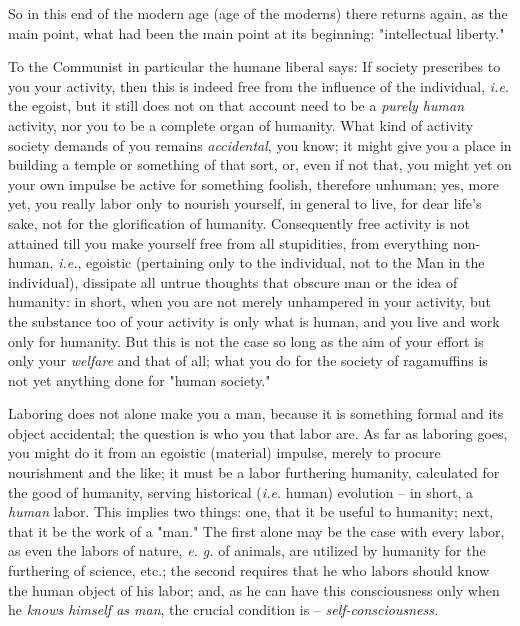So in this end of the modern age (age of the moderns) there returns again, as 
the main point, what had been the main point at its beginning: "{}intellectual 
liberty."{}

To the Communist in particular the humane liberal says: If society prescribes 
to you your activity, then this is indeed free from the influence of the 
individual, \textit{i.e.} the egoist, but it still does not on that account 
need to be a \textit{purely human} activity, nor you to be a complete organ of 
humanity. What kind of activity society demands of you remains 
\textit{accidental}, you know; it might give you a place in building a temple 
or something of that sort, or, even if not that, you might yet on your own 
impulse be active for something foolish, therefore unhuman; yes, more yet, you 
really labor only to nourish yourself, in general to live, for dear life's 
sake, not for the glorification of humanity. Consequently free activity is not 
attained till you make yourself free from all stupidities, from everything 
non-human, \textit{i.e.}, egoistic (pertaining only to the individual, not to 
the Man in the individual), dissipate all untrue thoughts that obscure man or 
the idea of humanity: in short, when you are not merely unhampered in your 
activity, but the substance too of your activity is only what is human, and 
you live and work only for humanity. But this is not the case so long as the 
aim of your effort is only your \textit{welfare} and that of all; what you do 
for the society of ragamuffins is not yet anything done for "{}human 
society."{}

Laboring does not alone make you a man, because it is something formal and its 
object accidental; the question is who you that labor are. As far as laboring 
goes, you might do it from an egoistic (material) impulse, merely to procure 
nourishment and the like; it must be a labor furthering humanity, calculated 
for the good of humanity, serving historical (\textit{i.e.} human) evolution 
-- in short, a \textit{human} labor. This implies two things: one, that it be 
useful to humanity; next, that it be the work of a "{}man."{} The first alone 
may be the case with every labor, as even the labors of nature, \textit{e. g.} 
of animals, are utilized by humanity for the furthering of science, etc.; the 
second requires that he who labors should know the human object of his labor; 
and, as he can have this consciousness only when he \textit{knows himself as 
man}, the crucial condition is -- \textit{self-consciousness.}

